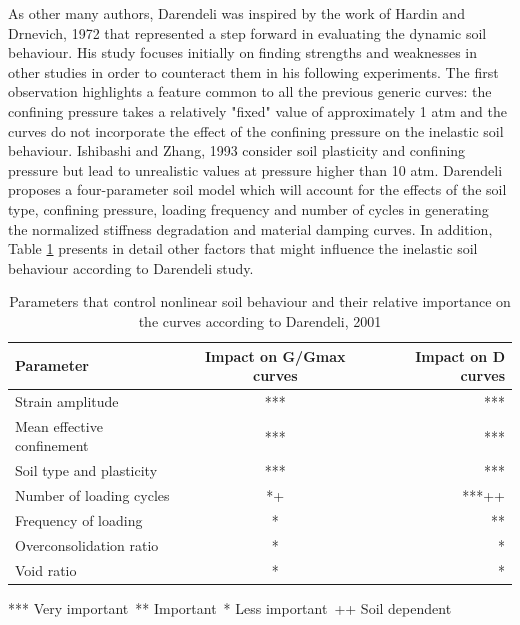\documentclass[12pt,a4paper]{report}
\begin{document}
As other many authors, Darendeli was inspired by the work of Hardin and Drnevich, 1972\cite{hardin1972shear} that represented a step forward in evaluating the dynamic soil behaviour. His study focuses initially on finding strengths and weaknesses in other studies in order to counteract them in his following experiments. The first observation highlights a feature common to all the previous generic curves: the confining pressure takes a relatively "fixed" value of approximately 1 atm and the curves do not incorporate the effect of the confining pressure on the inelastic soil behaviour. Ishibashi and Zhang, 1993 \cite{ishibashi1993unified} consider soil plasticity and confining pressure but lead to unrealistic values at pressure higher than 10 atm. Darendeli proposes a four-parameter soil model which will account for the effects of the soil type, confining pressure, loading frequency and number of cycles in generating the normalized stiffness degradation and material damping curves. In addition, Table \ref{Darendeli_param} presents in detail other factors that might influence the inelastic soil behaviour according to Darendeli study.

\begin{table}[h!]
\centering
\begin{tabular}{|l|c|r|}
	\hline Parameter       &      Impact on G/Gmax curves   &  Impact on D curves     \\ 
	\hline Strain amplitude    & *** &  ***  \\ 
	\hline Mean effective confinement  & ***  &  ***  \\ 
	\hline Soil type and plasticity &  ***  &  ***    \\ 
	\hline Number of loading cycles &  *+  &  ***++    \\ 
	\hline Frequency of loading &  *  &    **    \\ 
	\hline Overconsolidation ratio &  *  &    *    \\ 
	\hline Void ratio  &   *   &    *    \\ 
	\hline
\end{tabular}

*** Very important\
** Important\
* Less important\
++ Soil dependent\
\caption{Parameters that control nonlinear soil behaviour and their relative importance on the curves according to Darendeli, 2001 \cite{darendeli2001development}}
\label{Darendeli_param}
\end{table}
\end{document}
